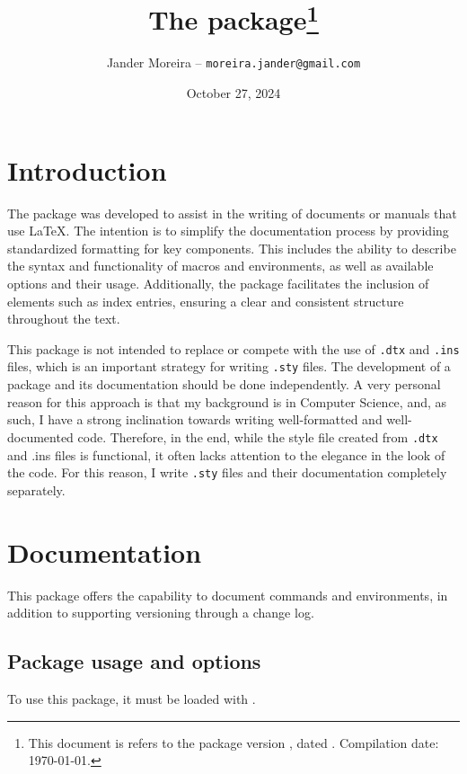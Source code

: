 \documentclass[11pt, outdir = ./out]{article}
\title{The \PackageName{docs} package\footnote{This document is refers to the package version \DocsVersion, dated \DocsDate. Compilation date: \today.}}
\author{Jander Moreira -- \texttt{moreira.jander@gmail.com}}
\date{October 27, 2024}
\begin{document}
\maketitle
\tableofcontents

\DocsPrintChanges


\section{Introduction}

The  package was developed to assist in the writing of documents or manuals that use \LaTeX. The intention is to simplify the documentation process by providing standardized formatting for key components. This includes the ability to describe the syntax and functionality of macros and environments, as well as available options and their usage. Additionally, the package facilitates the inclusion of elements such as index entries, ensuring a clear and consistent structure throughout the text.

This package is not intended to replace or compete with the use of \texttt{.dtx} and \texttt{.ins} files, which is an important strategy for writing \texttt{.sty} files. The development of a package and its documentation should be done independently. A very personal reason for this approach is that my background is in Computer Science, and, as such, I have a strong inclination towards writing well-formatted and well-documented code. Therefore, in the end, while the style file created from \texttt{.dtx} and .ins files is functional, it often lacks attention to the elegance in the look of the code. For this reason, I write \texttt{.sty} files and their documentation completely separately.


\section {Documentation}

This package offers the capability to document commands and environments, in addition to supporting versioning through a change log.

\subsection{Package usage and options}
To use this package, it must be loaded with .
\end{document}
